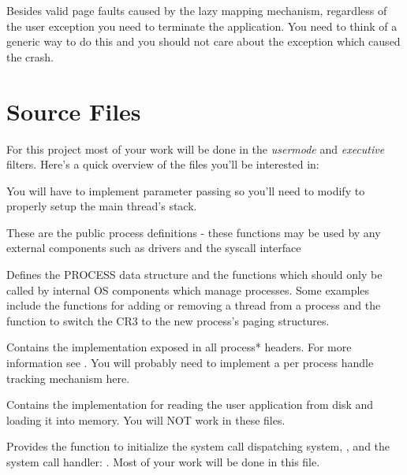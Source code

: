 Besides valid page faults caused by the lazy mapping mechanism, regardless of the user exception you
need to terminate the application. You need to think of a generic way to do this and you should not
care about the exception which caused the crash.

\section{Source Files}

For this project most of your work will be done in the \textit{usermode} and \textit{executive}
filters. Here's a quick overview of the files you'll be interested in:


You will have to implement parameter passing so you'll need to modify 
 to properly setup the main thread's stack.



These are the public process definitions - these functions may be used by any external components
such as drivers and the syscall interface


Defines the PROCESS data structure and the functions which should only be called by internal OS
components which manage processes. Some examples include the functions for adding or removing a
thread from a process and the function to switch the CR3 to the new process’s paging structures.


Contains the implementation exposed in all process* headers. For more information see
. You will probably need to implement a per process handle tracking
mechanism here.



Contains the implementation for reading the user application from disk and loading it into memory.
You will NOT work in these files.



Provides the function to initialize the system call dispatching system, , and
the system call handler: . Most of your work will be done in this file.

